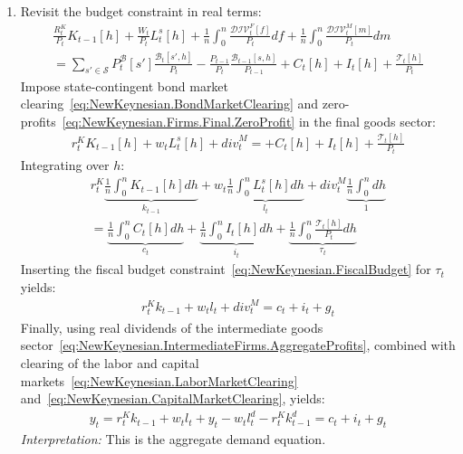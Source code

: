 \begin{enumerate}
\item
Revisit the budget constraint in real terms:
\begin{multline*}
  \frac{R^{K}_{t}}{P_{t}} K_{t-1}[h]
+ \frac{W_{t}}{P_{t}} L^{s}_{t}[h]
+ \frac{1}{n} \int_{0}^{n} \frac{\mathcal{DIV}^{F}_{t}[f]}{P_{t}} df
+ \frac{1}{n} \int_{0}^{n} \frac{\mathcal{DIV}^{M}_{t}[m]}{P_{t}} dm
\\
=
\sum_{s' \in \mathcal{S}} P^{\mathcal{B}}_{t}[s'] \frac{\mathcal{B}_{t}[s',h]}{P_{t}}
- \frac{P_{t-1}}{P_{t}} \frac{\mathcal{B}_{t-1}[s,h]}{P_{t-1}}
+ C_{t}[h]
+ I_{t}[h]
+ \frac{\mathcal{T}_{t}[h]}{P_{t}}
\end{multline*}
Impose state-contingent bond market clearing~\eqref{eq:NewKeynesian.BondMarketClearing}
  and zero-profits~\eqref{eq:NewKeynesian.Firms.Final.ZeroProfit} in the final goods sector:
\begin{align*}
  r^{K}_{t} K_{t-1}[h]
+ w_{t} L^{s}_{t}[h]
+ {div}^{M}_{t}
=
+ C_{t}[h] + I_{t}[h]
+ \frac{\mathcal{T}_{t}[h]}{P_{t}}
\end{align*}
Integrating over \(h\):
\begin{multline*}
  r^{K}_{t} \underbrace{\frac{1}{n} \int_{0}^{n} K_{t-1}[h] dh}_{k_{t-1}}
+ w_{t} \underbrace{\frac{1}{n} \int_{0}^{n} L^{s}_{t}[h] dh}_{l_{t}}
+ {div}^{M}_{t} \underbrace{\frac{1}{n} \int_{0}^{n} dh}_{1}
\\
=
  \underbrace{\frac{1}{n} \int_{0}^{n} C_{t}[h] dh}_{c_{t}}
+ \underbrace{\frac{1}{n} \int_{0}^{n} I_{t}[h] dh}_{i_{t}}
+ \underbrace{\frac{1}{n} \int_{0}^{n} \frac{\mathcal{T}_{t}[h]}{P_{t}} dh}_{\tau_{t}}
\end{multline*}
Inserting the fiscal budget constraint~\eqref{eq:NewKeynesian.FiscalBudget} for \(\tau_{t}\) yields:
\begin{align*}
  r^{K}_{t} k_{t-1}
+ w_{t} l_{t}
+ {div}^{M}_{t}
=
  c_{t}
+ i_{t}
+ g_{t}
\end{align*}
Finally, using real dividends of the intermediate goods sector~\eqref{eq:NewKeynesian.IntermediateFirms.AggregateProfits},
  combined with clearing of the labor and capital markets~\eqref{eq:NewKeynesian.LaborMarketClearing} and~\eqref{eq:NewKeynesian.CapitalMarketClearing}, yields:
\begin{align*}
y_{t} = 
  r^{K}_{t} k_{t-1}
+ w_{t} l_{t}
+ y_t - w_t l^{d}_{t} - r^{K}_{t} k^{d}_{t-1}
= c_{t} + i_{t} + g_{t}
\end{align*}
\emph{Interpretation:} This is the aggregate demand equation.
	

\end{enumerate}
